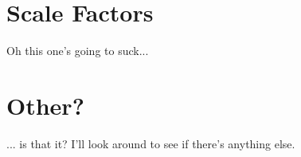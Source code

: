     \section{Scale Factors}
        Oh this one's going to suck...


    \section{Other?}
        ... is that it? I'll look around to see if there's anything else.



